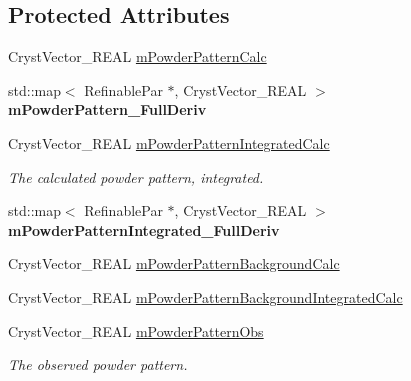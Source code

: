 \subsection*{Protected Attributes}
\begin{DoxyCompactItemize}
\item 
Cryst\+Vector\+\_\+\+R\+E\+AL \mbox{\hyperlink{class_obj_cryst_1_1_powder_pattern_a039c845ac70b5118f5090077a5ef7f70}{m\+Powder\+Pattern\+Calc}}
\item 
\mbox{\label{class_obj_cryst_1_1_powder_pattern_afa0be271569177203cde206fa2dac27b}} 
std\+::map$<$ Refinable\+Par $\ast$, Cryst\+Vector\+\_\+\+R\+E\+AL $>$ {\bfseries m\+Powder\+Pattern\+\_\+\+Full\+Deriv}
\item 
\mbox{\label{class_obj_cryst_1_1_powder_pattern_abf4b59b588e54dd6504722a4e8700c43}} 
Cryst\+Vector\+\_\+\+R\+E\+AL \mbox{\hyperlink{class_obj_cryst_1_1_powder_pattern_abf4b59b588e54dd6504722a4e8700c43}{m\+Powder\+Pattern\+Integrated\+Calc}}
\begin{DoxyCompactList}\small\item\em The calculated powder pattern, integrated. \end{DoxyCompactList}\item 
\mbox{\label{class_obj_cryst_1_1_powder_pattern_a77c062fa0db18e116f92f9ef55154616}} 
std\+::map$<$ Refinable\+Par $\ast$, Cryst\+Vector\+\_\+\+R\+E\+AL $>$ {\bfseries m\+Powder\+Pattern\+Integrated\+\_\+\+Full\+Deriv}
\item 
Cryst\+Vector\+\_\+\+R\+E\+AL \mbox{\hyperlink{class_obj_cryst_1_1_powder_pattern_aa38c508b5516a2b4e357b7116e0b11da}{m\+Powder\+Pattern\+Background\+Calc}}
\item 
Cryst\+Vector\+\_\+\+R\+E\+AL \mbox{\hyperlink{class_obj_cryst_1_1_powder_pattern_a18da34aac86b27d5511268113b5f9260}{m\+Powder\+Pattern\+Background\+Integrated\+Calc}}
\item 
\mbox{\label{class_obj_cryst_1_1_powder_pattern_aa7de3fc187edf28b3688569866b00700}} 
Cryst\+Vector\+\_\+\+R\+E\+AL \mbox{\hyperlink{class_obj_cryst_1_1_powder_pattern_aa7de3fc187edf28b3688569866b00700}{m\+Powder\+Pattern\+Obs}}
\begin{DoxyCompactList}\small\item\em The observed powder pattern. \end{DoxyCompactList}\item 

\end{DoxyCompactItemize}
